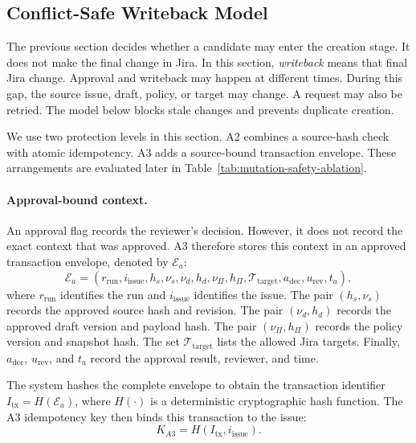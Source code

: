 \documentclass[pdflatex,sn-basic]{sn-jnl}
\begin{document}
\subsection{Conflict-Safe Writeback Model}

The previous section decides whether a candidate may enter the creation stage. It does not make the final change in Jira. In this section, \emph{writeback} means that final Jira change. Approval and writeback may happen at different times. During this gap, the source issue, draft, policy, or target may change. A request may also be retried. The model below blocks stale changes and prevents duplicate creation.

We use two protection levels in this section. A2 combines a source-hash check with atomic idempotency. A3 adds a source-bound transaction envelope. These arrangements are evaluated later in Table~\ref{tab:mutation-safety-ablation}.

\paragraph{Approval-bound context.}
An approval flag records the reviewer's decision. However, it does not record the exact context that was approved. A3 therefore stores this context in an approved transaction envelope, denoted by $\mathcal{E}_a$:
\begin{equation}
\mathcal{E}_a=(r_{\mathrm{run}},i_{\mathrm{issue}},h_s,\nu_s,\nu_d,h_d,\nu_{\Pi},h_{\Pi},\mathcal{T}_{\mathrm{target}},a_{\mathrm{dec}},u_{\mathrm{rev}},t_a),
\end{equation}
where $r_{\mathrm{run}}$ identifies the run and $i_{\mathrm{issue}}$ identifies the issue. The pair $(h_s,\nu_s)$ records the approved source hash and revision. The pair $(\nu_d,h_d)$ records the approved draft version and payload hash. The pair $(\nu_{\Pi},h_{\Pi})$ records the policy version and snapshot hash. The set $\mathcal{T}_{\mathrm{target}}$ lists the allowed Jira targets. Finally, $a_{\mathrm{dec}}$, $u_{\mathrm{rev}}$, and $t_a$ record the approval result, reviewer, and time.

The system hashes the complete envelope to obtain the transaction identifier $I_{\mathrm{tx}}=H(\mathcal{E}_a)$, where $H(\cdot)$ is a deterministic cryptographic hash function. The A3 idempotency key then binds this transaction to the issue:
\begin{equation}
K_{A3}=H(I_{\mathrm{tx}},i_{\mathrm{issue}}).
\end{equation}
\end{document}
